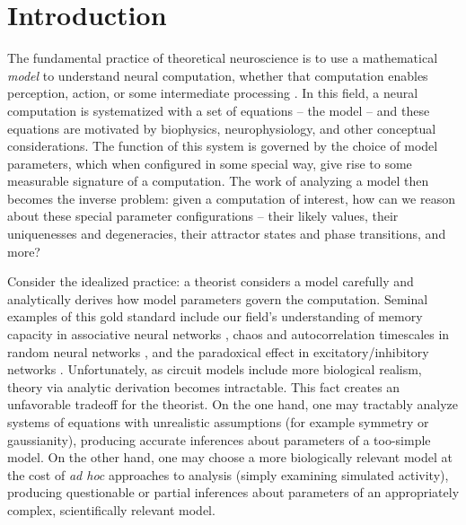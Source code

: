 \documentclass[11pt]{article}
\begin{document}
\section{Introduction}

The fundamental practice of theoretical neuroscience is to use a mathematical \emph{model} to understand neural computation, whether that computation enables perception, action, or some intermediate processing \cite{abbott2008theoretical}.  
In this field, a neural computation is systematized with a set of equations -- the model -- and these equations are motivated by biophysics, neurophysiology, and other conceptual considerations.
The function of this system is governed by the choice of model parameters, which when configured in some special way, give rise to some measurable signature of a computation.   
The work of analyzing a model then becomes the inverse problem: given a computation of interest, how can we reason about these special parameter configurations -- their likely values, their uniquenesses and degeneracies, their attractor states and phase transitions, and more?  

Consider the idealized practice: a theorist considers a model carefully and analytically derives how model parameters govern the computation.  
Seminal examples of this gold standard include our field's understanding of memory capacity in associative neural networks \cite{hopfield1984neurons}, chaos and autocorrelation timescales in random neural networks \cite{sompolinsky1988chaos}, and the paradoxical effect in excitatory/inhibitory networks \cite{tsodyks1997paradoxical}.  
Unfortunately, as circuit models include more biological realism, theory via analytic derivation becomes intractable.  
This fact creates an unfavorable tradeoff for the theorist.  On the one hand, one may tractably analyze systems of equations with unrealistic assumptions (for example symmetry or gaussianity), producing accurate inferences about parameters of a too-simple model.  On the other hand, one may choose a more biologically relevant model at the cost of \emph{ad hoc} approaches to analysis (simply examining simulated activity), producing questionable or partial inferences about parameters of an appropriately complex, scientifically relevant model.  %
\end{document}
